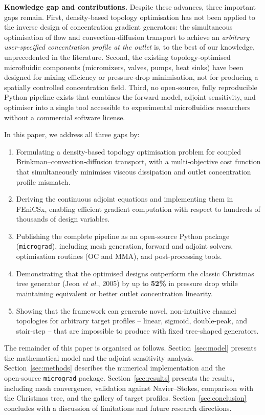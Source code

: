 \documentclass[12pt]{article}
\begin{document}
\textbf{Knowledge gap and contributions.} Despite these advances, three important gaps remain. First, density‑based topology optimisation has not been applied to the inverse design of concentration gradient generators: the simultaneous optimisation of flow and convection‑diffusion transport to achieve an \textit{arbitrary user‑specified concentration profile at the outlet} is, to the best of our knowledge, unprecedented in the literature. Second, the existing topology‑optimised microfluidic components (micromixers, valves, pumps, heat sinks) have been designed for mixing efficiency or pressure‑drop minimisation, not for producing a spatially controlled concentration field. Third, no open‑source, fully reproducible Python pipeline exists that combines the forward model, adjoint sensitivity, and optimiser into a single tool accessible to experimental microfluidics researchers without a commercial software license.

In this paper, we address all three gaps by:
\begin{enumerate}
    \item Formulating a density‑based topology optimisation problem for coupled Brinkman–convection‑diffusion transport, with a multi‑objective cost function that simultaneously minimises viscous dissipation and outlet concentration profile mismatch.
    \item Deriving the continuous adjoint equations and implementing them in FEniCSx, enabling efficient gradient computation with respect to hundreds of thousands of design variables.
    \item Publishing the complete pipeline as an open‑source Python package (\texttt{micrograd}), including mesh generation, forward and adjoint solvers, optimisation routines (OC and MMA), and post‑processing tools.
    \item Demonstrating that the optimised designs outperform the classic Christmas tree generator (Jeon \textit{et al.}, 2005) by up to \textbf{52\%} in pressure drop while maintaining equivalent or better outlet concentration linearity.
    \item Showing that the framework can generate novel, non‑intuitive channel topologies for arbitrary target profiles – linear, sigmoid, double‑peak, and stair‑step – that are impossible to produce with fixed tree‑shaped generators.
\end{enumerate}

The remainder of this paper is organised as follows. Section~\ref{sec:model} presents the mathematical model and the adjoint sensitivity analysis. Section~\ref{sec:methods} describes the numerical implementation and the open‑source \texttt{micrograd} package. Section~\ref{sec:results} presents the results, including mesh convergence, validation against Navier–Stokes, comparison with the Christmas tree, and the gallery of target profiles. Section~\ref{sec:conclusion} concludes with a discussion of limitations and future research directions.
\end{document}
